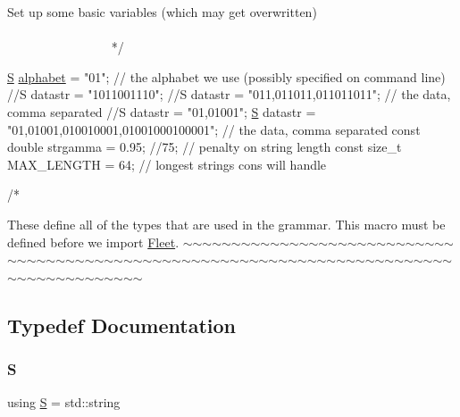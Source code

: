 \begin{DoxyCode}
    Set up some basic variables (which may \textcolor{keyword}{get} overwritten)
   ~~~~~~~~~~~~~~~~~~~~~~~~~~~~~~~~~~~~~~~~~~~~~~~~~~~~~~~~~~~~~~~~~~~~~~~~~~~~~~~~~~~~~~~~ */

\hyperlink{_formal_language_theory-_complex_2_main_8cpp_a51c40915539205f0b5add30b0d68a4cb}{S} \hyperlink{_formal_language_theory-_complex_2_main_8cpp_ad762aabf5f551e4c7632fb389b3e2209}{alphabet} = \textcolor{stringliteral}{"01"}; \textcolor{comment}{// the alphabet we use (possibly specified on command line)}
\textcolor{comment}{//S datastr = "1011001110";}
\textcolor{comment}{//S datastr  = "011,011011,011011011"; // the data, comma separated}
\textcolor{comment}{//S datastr = "01,01001";}
\hyperlink{_formal_language_theory-_complex_2_main_8cpp_a51c40915539205f0b5add30b0d68a4cb}{S} datastr  = \textcolor{stringliteral}{"01,01001,010010001,01001000100001"}; \textcolor{comment}{// the data, comma separated}
\textcolor{keyword}{const} \textcolor{keywordtype}{double} strgamma = 0.95; \textcolor{comment}{//75; // penalty on string length}
\textcolor{keyword}{const} \textcolor{keywordtype}{size\_t} MAX\_LENGTH = 64; \textcolor{comment}{// longest strings cons will handle}

\textcolor{comment}{/*}
\end{DoxyCode}
 These define all of the types that are used in the grammar. This macro must be defined before we import \hyperlink{namespace_fleet}{Fleet}. $\sim$$\sim$$\sim$$\sim$$\sim$$\sim$$\sim$$\sim$$\sim$$\sim$$\sim$$\sim$$\sim$$\sim$$\sim$$\sim$$\sim$$\sim$$\sim$$\sim$$\sim$$\sim$$\sim$$\sim$$\sim$$\sim$$\sim$$\sim$$\sim$$\sim$$\sim$$\sim$$\sim$$\sim$$\sim$$\sim$$\sim$$\sim$$\sim$$\sim$$\sim$$\sim$$\sim$$\sim$$\sim$$\sim$$\sim$$\sim$$\sim$$\sim$$\sim$$\sim$$\sim$$\sim$$\sim$$\sim$$\sim$$\sim$$\sim$$\sim$$\sim$$\sim$$\sim$$\sim$$\sim$$\sim$$\sim$$\sim$$\sim$$\sim$$\sim$$\sim$$\sim$$\sim$$\sim$$\sim$$\sim$$\sim$$\sim$$\sim$$\sim$$\sim$$\sim$$\sim$$\sim$$\sim$$\sim$$\sim$ 

\subsection{Typedef Documentation}
\mbox{\label{_formal_language_theory-_simple_2_main_8cpp_a51c40915539205f0b5add30b0d68a4cb}} 
\subsubsection{\texorpdfstring{S}{S}}
{\footnotesize\ttfamily using \hyperlink{_formal_language_theory-_complex_2_main_8cpp_a51c40915539205f0b5add30b0d68a4cb}{S} =  std\+::string}

